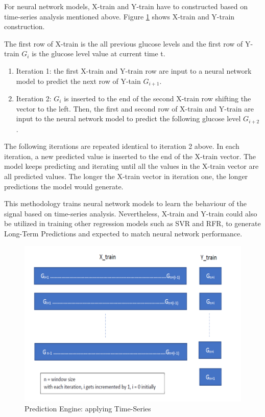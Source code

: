 For neural network models, X-train and Y-train have to constructed based on time-series analysis mentioned above. Figure \ref{time-series-app} shows X-train and Y-train construction. 

The first row of X-train is the all previous glucose levels and the first row of Y-train \ensuremath{G_i} is the glucose level value at current time t.

\begin{enumerate}
\item Iteration 1:  the first X-train and Y-train row are input to a neural network model to predict the next row of Y-tain \ensuremath{G_{i+1}}. 

\item Iteration 2: \ensuremath{G_i} is inserted to the end of the second X-train row shifting the vector to the left. Then, the first and second row of X-train and Y-train are input to the neural network model to predict the following glucose level \ensuremath{G_{i+2}}.
\end{enumerate}

The following iterations are repeated identical to iteration 2 above. In each iteration, a new predicted value is inserted to the end of the X-train vector. The model keeps predicting and iterating until all the values in the X-train vector are all predicted values. The longer the X-train vector in iteration one, the longer predictions the model would generate. 

This methodology trains neural network models to learn the behaviour of the signal based on time-series analysis. Nevertheless, X-train and Y-train could also be utilized in training other regression models such as SVR and RFR, to generate Long-Term Predictions and expected to match neural network performance.



\begin{center}
\begin{figure}[ht!]
	\centering
    \includegraphics[width = \textwidth]{Figures/mo/time-series-app.png}
 	\caption{Prediction Engine: applying Time-Series}
  	\label{time-series-app}
\end{figure}
\end{center}

